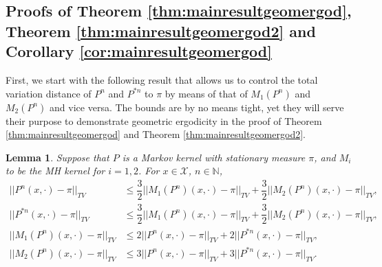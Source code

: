 \documentclass[12pt,a4]{amsart}
\numberwithin{equation}{section}
\theoremstyle{plain}
\newtheorem{lemma}{Lemma}[section]
\theoremstyle{definition}
\theoremstyle{remark}
\newcommand{\1}{\mathds{1}}
\renewcommand{\leq}{\leqslant}
\begin{document}
\subsection{Proofs of Theorem \ref{thm:mainresultgeomergod}, Theorem \ref{thm:mainresultgeomergod2} and Corollary \ref{cor:mainresultgeomergod}}
First, we start with the following result that allows us to control the total variation distance of $P^n$ and $P^{*n}$ to $\pi$ by means of that of $M_1(P^n)$ and $M_2(P^n)$ and vice versa. The bounds are by no means tight, yet they will serve their purpose to demonstrate geometric ergodicity in the proof of Theorem \ref{thm:mainresultgeomergod} and Theorem \ref{thm:mainresultgeomergod2}.

\begin{lemma}\label{lem:tvPtvM1M2}
	Suppose that $P$ is a Markov kernel with stationary measure $\pi$, and $M_i$ to be the MH kernel for $i = 1,2$. For $x \in \mathcal{X}$, $n \in \mathbb{N}$,
	\allowdisplaybreaks
	\begin{align*}
		||P^n(x,\cdot) - \pi ||_{TV} &\leq \dfrac{3}{2} ||M_1(P^n)(x,\cdot) - \pi ||_{TV} + \dfrac{3}{2} ||M_2(P^n)(x,\cdot) - \pi ||_{TV}, \\
		||P^{*n}(x,\cdot) - \pi ||_{TV} &\leq \dfrac{3}{2} ||M_1(P^n)(x,\cdot) - \pi ||_{TV} + \dfrac{3}{2} ||M_2(P^n)(x,\cdot) - \pi ||_{TV}, \\		
		||M_1(P^n)(x,\cdot) - \pi ||_{TV} &\leq 2 ||P^n(x,\cdot) - \pi ||_{TV} + 2 ||P^{*n}(x,\cdot) - \pi ||_{TV}, \\
		||M_2(P^n)(x,\cdot) - \pi ||_{TV} &\leq 3 ||P^n(x,\cdot) - \pi ||_{TV} + 3 ||P^{*n}(x,\cdot) - \pi ||_{TV}. \\
	\end{align*}
\end{lemma}
\end{document}
